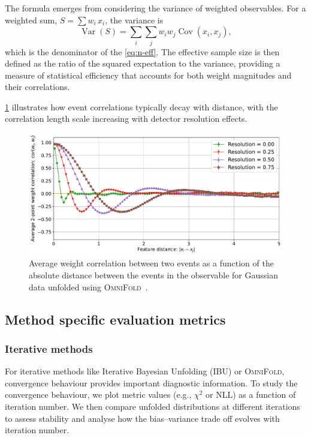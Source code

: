             The formula emerges from considering the variance of weighted observables.
            For a weighted sum, \(S = \sum w_i\,x_i\), the variance is
            \[
                \operatorname{Var}(S) = \sum_i \sum_j w_i w_j \operatorname{Cov}(x_i, x_j),
            \]
             which is the denominator of the \cref{eq:n-eff}.
             The effective sample size is then defined as the ratio of the squared expectation to the variance, providing a measure of statistical efficiency that accounts for both weight magnitudes and their correlations.
             
            \cref{fig:corr-decay} illustrates how event correlations typically decay with distance, with the correlation length scale increasing with detector resolution effects.
            \begin{figure}
                \centering
                \includegraphics[width=\linewidth]{figures/chapter-02/weight-correlation-vs-distance-1d-set1.pdf}
                \caption[Weight correlation between event pairs as a function of distance between events.]{Average weight correlation between two events as a function of the absolute distance between the events in the observable for Gaussian data unfolded using \textsc{OmniFold}~\cite{Desai:2025mpy}.\protect\footnotemark
                }
                \label{fig:corr-decay}
            \end{figure}
    \subsection{Method specific evaluation metrics}
        \subsubsection{Iterative methods}
            For iterative methods like Iterative Bayesian Unfolding (IBU) or \textsc{OmniFold}, convergence behaviour provides important diagnostic information.
        To study the convergence behaviour, we plot metric values (e.g., \(\chi^2\) or NLL) as a function of iteration number.
        We then compare unfolded distributions at different iterations to assess stability and analyse how the bias--variance trade off evolves with iteration number.

